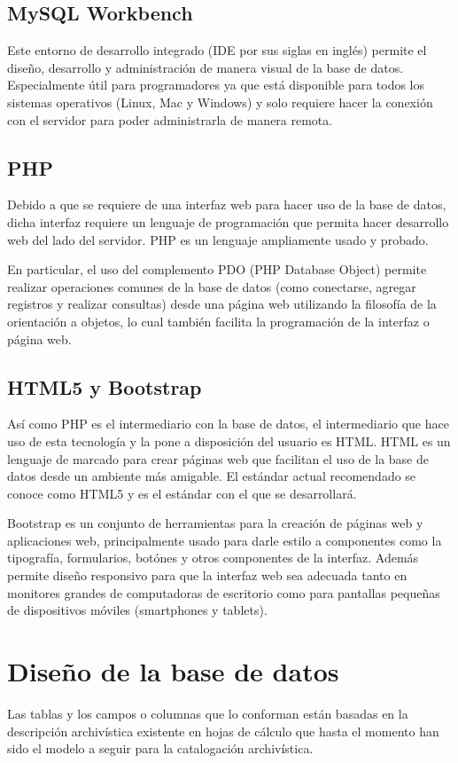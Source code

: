 \documentclass[10pt,letterpaper]{article}
\begin{document}
\subsection{MySQL Workbench}
Este entorno de desarrollo integrado (IDE por sus siglas en inglés) permite el diseño, desarrollo y administración de manera visual de la base de datos. Especialmente útil para programadores ya que está disponible para todos los sistemas operativos (Linux, Mac y Windows) y solo requiere hacer la conexión con el servidor para poder administrarla de manera remota.

\subsection{PHP}
Debido a que se requiere de una interfaz web para hacer uso de la base de datos, dicha interfaz requiere un lenguaje de programación que permita hacer desarrollo web del lado del servidor. PHP es un lenguaje ampliamente usado y probado.

En particular, el uso del complemento PDO (PHP Database Object) permite realizar operaciones comunes de la base de datos (como conectarse, agregar registros y realizar consultas) desde una página web utilizando la filosofía de la orientación a objetos, lo cual también facilita la programación de la interfaz o página web.

\subsection{HTML5 y Bootstrap}
Así como PHP es el intermediario con la base de datos, el intermediario que hace uso de esta tecnología y la pone a disposición del usuario es HTML. HTML es un lenguaje de marcado para crear páginas web que facilitan el uso de la base de datos desde un ambiente más amigable. El estándar actual recomendado se conoce como HTML5 y es el estándar con el que se desarrollará.

Bootstrap es un conjunto de herramientas para la creación de páginas web y aplicaciones web, principalmente usado para darle estilo a componentes como la tipografía, formularios, botónes y otros componentes de la interfaz. Además permite diseño responsivo para que la interfaz web sea adecuada tanto en monitores grandes de computadoras de escritorio como para pantallas pequeñas de dispositivos móviles (smartphones y tablets).

\section{Diseño de la base de datos}
Las tablas y los campos o columnas que lo conforman están basadas en la descripción archivística existente en hojas de cálculo que hasta el momento han sido el modelo a seguir para la catalogación archivística.
\end{document}

